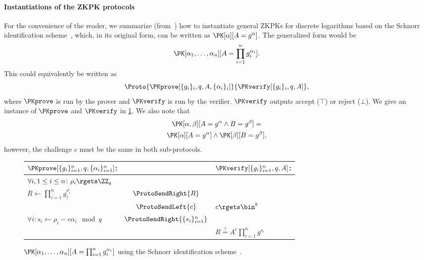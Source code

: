 \paragraph*{Instantiations of the \acs{ZKPK} protocols}

For the convenience of the reader, we summarize 
(from~\cite{Camenisch-phdthesis}) how to instantiate general \acp{ZKPK} for 
discrete logarithms based on the Schnorr identification scheme~\cite{Schnorr}, 
which, in its original form, can be written as \(\PK[\alpha][A = g^\alpha]\).
The generalized form would be \[
  \PK[\alpha_1, \dotsc, \alpha_n][A = \prod_{i=1}^n g_i^{\alpha_i}].
\]
This could equivalently be written as
\begin{equation*}
  \Proto%
  {\PKprove[\{g_i\}_i, q, A, \{\alpha_i\}_i]}%
  {\PKverify[\{g_i\}_i, q, A]},
\end{equation*}
where \(\PKprove\) is run by the prover and \(\PKverify\) is run by the 
verifier.
\(\PKverify\) outputs accept (\(\top\)) or reject (\(\bot\)).
We give an instance of \(\PKprove\) and \(\PKverify\) in \cref{PKalgorithms}.
We also note that
\begin{multline*}
  \PK[\alpha, \beta][A = g^\alpha \land B = g^\beta] = \\
  \PK[\alpha][A = g^\alpha] \land \PK[\beta][B = g^\beta],
\end{multline*}
however, the challenge \(c\) must be the same in both sub-protocols.

\begin{figure*}
  \small
  \begin{tabular}{lcl}
    \(\PKprove[\{g_i\}_{i=1}^n, q, \{\alpha_i\}_{i=1}^n]\):
    &
    & \(\PKverify[\{g_i\}_{i=1}^n, q, A]\):
    \\
    \midrule

    \(\forall i, 1\leq i\leq n\colon \rho_i\rgets \ZZ_q\)
    &
    &
    \\

    \(R\gets \prod_{i=1}^n g_i^{\rho_i}\)
    & \(\ProtoSendRight{R}\)
    &
    \\

    & \(\ProtoSendLeft{c}\)
    & \(c\rgets \bin^k\)
    \\

    \(\forall i\colon s_i\gets \rho_i - c\alpha_i \mod q\)
    & \(\ProtoSendRight{\{s_i\}_{i=1}^n}\)
    &
    \\

    &
    & \(R \stackrel{?}{=} A^c \prod_{i=1}^n g^{s_i}\)
    \\
    
  \end{tabular}
  \caption{%
    \(\PK[\alpha_1, \dotsc, \alpha_n][A = \prod_{i=1}^n g_i^{\alpha_i}]\) using 
    the Schnorr identification scheme~\cite{Camenisch-phdthesis}.
  }%
  \label{PKalgorithms}
\end{figure*}

